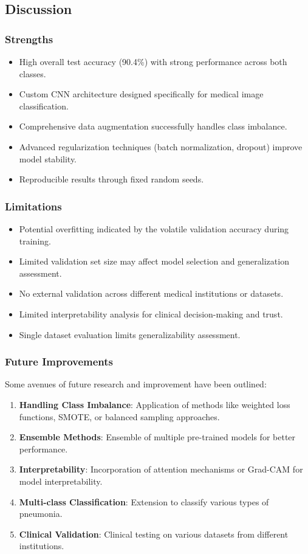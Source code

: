 \documentclass[conference]{IEEEtran}
\begin{document}
\subsection{Discussion}
\subsubsection{Strengths}
\begin{itemize}
    \item High overall test accuracy (90.4\%) with strong performance across both classes.
    \item Custom CNN architecture designed specifically for medical image classification.
    \item Comprehensive data augmentation successfully handles class imbalance.
    \item Advanced regularization techniques (batch normalization, dropout) improve model stability.
    \item Reproducible results through fixed random seeds.
\end{itemize}

\subsubsection{Limitations}
\begin{itemize}
    \item Potential overfitting indicated by the volatile validation accuracy during training.
    \item Limited validation set size may affect model selection and generalization assessment.
    \item No external validation across different medical institutions or datasets.
    \item Limited interpretability analysis for clinical decision-making and trust.
    \item Single dataset evaluation limits generalizability assessment.
\end{itemize}

\subsubsection{Future Improvements}
Some avenues of future research and improvement have been outlined:
\begin{enumerate}
    \item \textbf{Handling Class Imbalance}: Application of methods like weighted loss functions, SMOTE, or balanced sampling approaches.
    \item \textbf{Ensemble Methods}: Ensemble of multiple pre-trained models for better performance.
    \item \textbf{Interpretability}: Incorporation of attention mechanisms or Grad-CAM for model interpretability.
    \item \textbf{Multi-class Classification}: Extension to classify various types of pneumonia.
    \item \textbf{Clinical Validation}: Clinical testing on various datasets from different institutions.
\end{enumerate}
\end{document}
